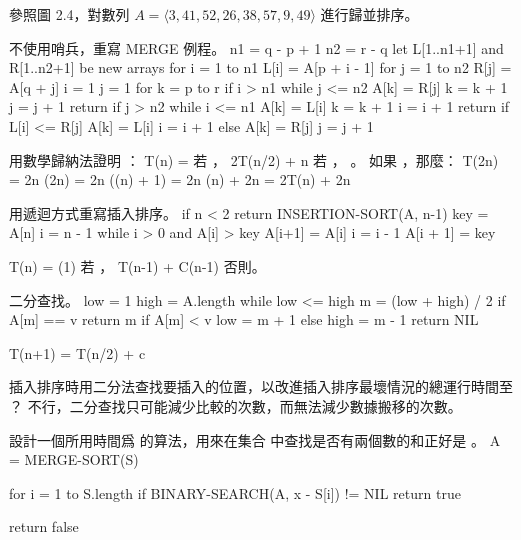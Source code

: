 \startsection[
  title={Designing algorithms},
]

\startEXERCISE
參照圖 2.4，對數列 $A=\langle 3,41,52,26,38,57,9,49\rangle$ 進行歸並排序。
\stopEXERCISE
\startANSWER
\externalfigure[output/e2_3_1-1]
\stopANSWER

\startEXERCISE
不使用哨兵，重寫 MERGE 例程。
\stopEXERCISE
\startANSWER
\startCLRS
n1 = q - p + 1
n2 = r - q
let L[1..n1+1] and R[1..n2+1] be new arrays
for i = 1 to n1
	L[i] = A[p + i - 1]
for j = 1 to n2
	R[j] = A[q + j]
i = 1
j = 1
for k = p to r
	if i > n1
		while j <= n2
			A[k] = R[j]
			k = k + 1
			j = j + 1
		return
	if j > n2
		while i <= n1
			A[k] = L[i]
			k = k + 1
			i = i + 1
		return
	if L[i] <= R[j]
		A[k] = L[i]
		i = i + 1
	else A[k] = R[j]
		j = j + 1
\stopCLRS
\stopANSWER

\startEXERCISE
用數學歸納法證明 ：
\startformula
T(n) = \startmathcases
{}		\NC 若 ， \NR
\NC 2T(n/2) + n	\NC 若 ， 。 \NR
\stopmathcases
\stopformula
\stopEXERCISE
\startANSWER
如果 ，那麼：
\startformula\startalign
\NC T(2n)	\NC = 2n \lg(2n) \NR
\NC		\NC = 2n (\lg(n) + 1) \NR
\NC		\NC = 2n \lg(n) + 2n \NR
\NC		\NC = 2T(n) + 2n \NR
\stopalign\stopformula
\stopANSWER

\startEXERCISE
用遞迴方式重寫插入排序。
\stopEXERCISE
\startANSWER
{}
\startCLRS
if n < 2
	return
INSERTION-SORT(A, n-1)
key = A[n]
i = n - 1
while i > 0 and A[i] > key
	A[i+1] = A[i]
	i = i - 1
A[i + 1] = key
\stopCLRS

\startformula
T(n) = \startmathcases
\NC \Theta(1)		\NC 若 ， \NR
\NC T(n-1) + C(n-1)	\NC 否則。 \NR
\stopmathcases
\stopformula
\stopANSWER

二分查找。
\stopEXERCISE
\startANSWER
{}
\startCLRS
low = 1
high = A.length
while low <= high
	m = (low + high) / 2
	if A[m] == v
		return m
	if A[m] < v
		low = m + 1
	else
		high = m - 1
return NIL
\stopCLRS

\startformula
T(n+1) = T(n/2) + c
\stopformula
\stopANSWER

\startEXERCISE
插入排序時用二分法查找要插入的位置，以改進插入排序最壞情況的總運行時間至 ？
\stopEXERCISE
\startANSWER
不行，二分查找只可能減少比較的次數，而無法減少數據搬移的次數。
\stopANSWER

\startEXERCISE
設計一個所用時間爲  的算法，用來在集合  中查找是否有兩個數的和正好是 。
\stopEXERCISE
\startANSWER
{}
\startCLRS
A = MERGE-SORT(S)

for i = 1 to S.length
	if BINARY-SEARCH(A, x - S[i]) != NIL
		return true

return false
\stopCLRS
\stopANSWER

\stopsection
